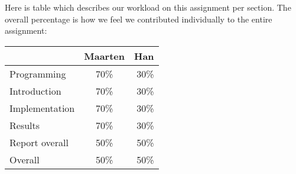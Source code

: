 Here is table which describes our workload on this assignment per section. The overall percentage is how we feel we contributed individually to the entire assignment:

\begin{tabular}{ l | c | r }
    & Maarten & Han \\ \hline
  Programming & 70\% & 30\% \\
  \hline
  Introduction & 70\% & 30\% \\
  Implementation & 70\% & 30\% \\
  Results & 70\% & 30\% \\
  \hline
  Report overall & 50\% & 50\% \\ \hline \hline
  Overall & 50\% & 50\%
\end{tabular}